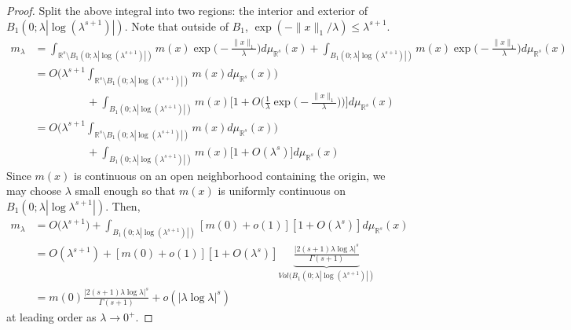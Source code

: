 \documentclass[10pt,fleqn]{article} \pdfoutput=1
\DeclareMathOperator{\1}{\mathbbm{1}} \DeclareMathOperator{\bigO}{\mc O}
\begin{document}
\begin{proof}
	Split the above integral into two regions: the interior and exterior of
	$B_1(0;\lambda|\log(\lambda^{s+1})|)$. Note that outside of $B_1$,
	$\exp(-\|x\|_1/\lambda) \le \lambda^{s+1}.$ \begin{align*} m_\lambda & =
		\int_{\mathbb{R}^s \setminus
			B_1(0;\lambda|\log(\lambda^{s+1})|)}m(x)
		\exp\bigg(-\frac{\|x\|_1}{\lambda}\bigg)d\mu_{\mathbb{R}^s}(x) +
		\int_{B_1(0;\lambda|\log(\lambda^{s+1})|)}m(x)
		\exp\bigg(-\frac{\|x\|_1}{\lambda}\bigg)d\mu_{\mathbb{R}^s}(x)            \\
		          & =O\bigg( \lambda^{s+1} \int_{\mathbb{R}^s \setminus
			B_1(0;\lambda|\log(\lambda^{s+1})|)}m(x)
		d\mu_{\mathbb{R}^s}(x)\bigg)                                              \\ &\hspace{2cm}+
		\int_{B_1(0;\lambda|\log(\lambda^{s+1})|)} m(x)
		\bigg[1+O\bigg(\frac{1}{\lambda}\exp\bigg(-\frac{\|x\|_1}{\lambda}\bigg)\bigg)\bigg]d\mu_{\mathbb{R}^s}(x)
		\\ &=O\bigg( \lambda^{s+1} \int_{\mathbb{R}^s \setminus
			B_1(0;\lambda|\log(\lambda^{s+1})|)}m(x) d\mu_{\mathbb{R}^s}(x)\bigg)     \\
		          & \hspace{2cm}+ \int_{B_1(0;\lambda|\log(\lambda^{s+1})|)} m(x)
		\bigg[1+O(\lambda^s) \bigg]d\mu_{\mathbb{R}^s}(x)\end{align*} Since $m(x)$
	is continuous on an open neighborhood containing the origin, we may choose
	$\lambda$ small enough so that $m(x)$ is uniformly continuous on
	$B_1(0;\lambda |\log \lambda^{s+1}|).$ Then, \begin{align*} m_\lambda & =
		O\bigg( \lambda^{s+1} \bigg) +
		\int_{B_1(0;\lambda|\log(\lambda^{s+1})|)} [m(0) +
			o(1)][1+O(\lambda^s)] d\mu_{\mathbb{R}^s} (x)                                       \\ &=
		O(\lambda^{s+1}) + [m(0)+o(1)][1+ O(\lambda^s)]
		\underbrace{\frac{|2(s+1)\lambda \log \lambda
				|^s}{\Gamma(s+1)}}_{Vol(B_1(0;\lambda|\log(\lambda^{s+1})|)}                        \\
		          & = m(0) \frac{|2(s+1)\lambda \log \lambda |^s}{\Gamma(s+1)} + o(|\lambda
		\log \lambda|^s)\end{align*} at leading order as $\lambda\to 0^+$.



\end{proof}
\end{document}

